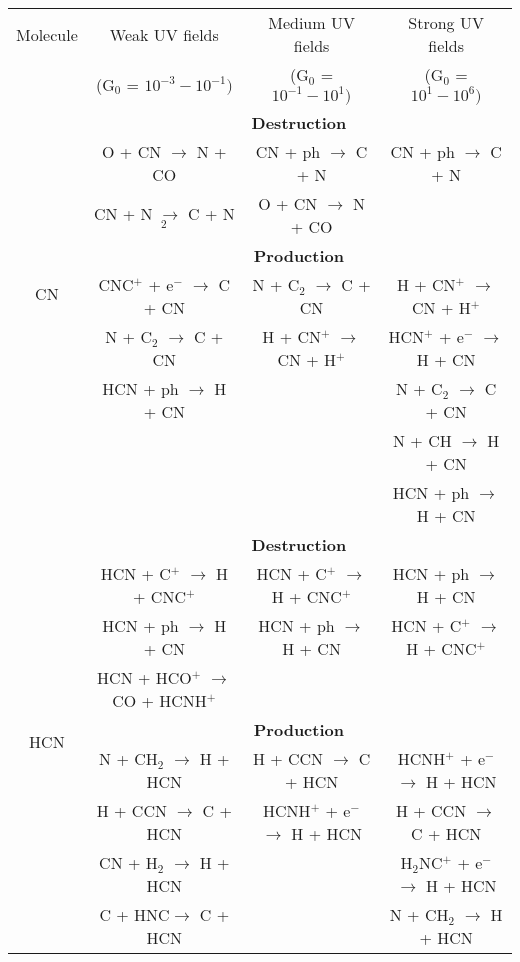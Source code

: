 \documentclass{aa}
\begin{document}
\begin{appendix}
\begin{table*}
\begin{tabular}{c c c c} \hline\hline Molecule & Weak UV fields  & Medium UV fields  & Strong UV fields  \\
& (G$_0$ = $10^{-3} - 10^{-1})$ & (G$_0$ = $10^{-1} - 10^{1})$ & (G$_0$ = $10^{1} - 10^{6})$ \\ 
\hline 
\multirow{8}{*}{CN} & \multicolumn{3}{c}{\textbf{Destruction}}\\
 &O + CN $\rightarrow$ N + CO & CN + ph $\rightarrow$ C + N & CN + ph $\rightarrow$ C + N\\
  &CN + N $\rightarrow$ C + N$_2$ & O + CN $\rightarrow$ N + CO & \\
\vspace{2.5 pt} & \multicolumn{3}{c}{\textbf{Production}}\\ 
&CNC$^+$ + e$^-$ $\rightarrow$ C + CN & N
+ C$_2$ $\rightarrow$ C + CN &  H + CN$^+$ $\rightarrow$ CN + H$^+$\\ 
&N + C$_2$ $\rightarrow$ C + CN & H + CN$^+$ $\rightarrow$ CN + H$^+$ & HCN$^+$ + e$^-$ $\rightarrow$ H + CN \\
&HCN + ph $\rightarrow$ H + CN &  & N + C$_2$ $\rightarrow$ C + CN\\
 &  &   & N + CH $\rightarrow$ H + CN\\ 
 &  &   & HCN + ph $\rightarrow$ H + CN\\ 
 \hline 
 \multirow{9}{*}{HCN} & \multicolumn{3}{c}{\textbf{Destruction}}\\ 
 &HCN + C$^+$ $\rightarrow$ H + CNC$^+$ & HCN + C$^+$ $\rightarrow$ H + CNC$^+$ &  HCN + ph $\rightarrow$ H + CN\\
 &HCN + ph $\rightarrow$ H + CN &HCN + ph $\rightarrow$ H + CN & HCN + C$^+$ $\rightarrow$ H + CNC$^+$\\
 &HCN + HCO$^+$ $\rightarrow$ CO + HCNH$^+$ &  &  \\
\vspace{2.5 pt} &\multicolumn{3}{c}{\textbf{Production}}\\
&N + CH$_2$ $\rightarrow$ H + HCN & H + CCN $\rightarrow$ C + HCN & HCNH$^+$ + e$^-$ $\rightarrow$ H + HCN\\
&H + CCN $\rightarrow$ C + HCN & HCNH$^+$ + e$^-$ $\rightarrow$ H + HCN & H + CCN $\rightarrow$ C +
HCN\\ &CN + H$_2$ $\rightarrow$ H + HCN & & H$_2$NC$^+$ + e$^-$ $\rightarrow$ H + HCN 
\\ &C + HNC$\rightarrow$ C + HCN & & N + CH$_2$ $\rightarrow$ H + HCN \\ 
\hline 
\end{tabular} 
\end{table*}



\end{appendix}
\end{document}
